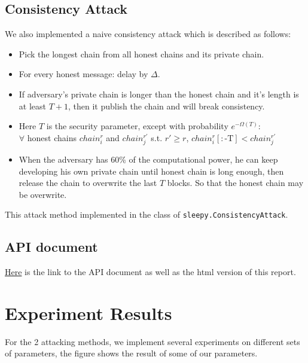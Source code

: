 \documentclass[
10pt, %
a4paper, %
oneside, %
headinclude,footinclude, %
BCOR5mm, %
]{scrartcl}
\begin{document}
\subsection{Consistency Attack}
We also implemented a naive consistency attack which is described as follows:
\begin{itemize}
	\item Pick the longest chain from all honest chains and its private chain.
	\item For every honest message: delay by $\Delta$.
	\item If adversary’s private chain is longer than the honest chain and it's length is at least $T + 1$, then it publish the chain and will break consistency.
	\item Here $T$ is the security parameter, except with probability $e^{-\Omega(T)}$: \\
	$\forall$ honest chains $chain^{r}_{i}$ and $chain_{j}^{r'}$ s.t. $r' \geq r$, $chain_{i}^r[:\text{-T}] < chain_j^{r'}$
	\item When the adversary has 60\% of the computational power, he can keep developing his own private chain until honest chain is long enough, then release the chain to overwrite the last $ T $ blocks. So that the honest chain may be overwrite.
\end{itemize}
This attack method implemented in the class of \verb|sleepy.ConsistencyAttack|.
\subsection{API document}
\href{https://abcdabcd987.github.io/distributed-consensus-simulator/api_doc.html}{Here} is the link to the API document as well as the html version of this report.


\section{Experiment Results}
For the 2 attacking methods, we implement several experiments on different sets of parameters, the figure shows the result of some of our parameters.

\renewcommand{\refname}{\spacedlowsmallcaps{References}} %




\end{document}
